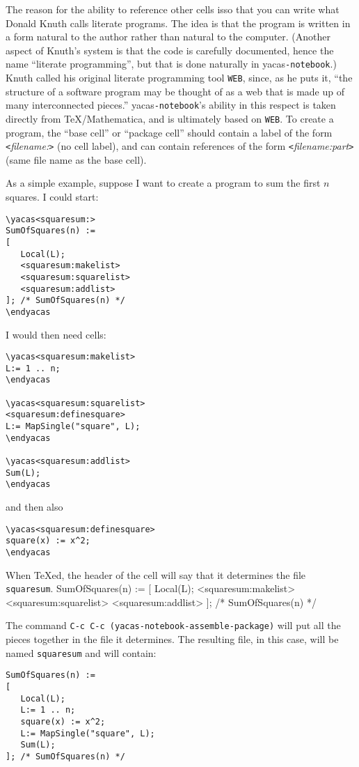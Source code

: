 \documentclass[12pt]{article}
\def\yn{\textsf{yacas}\texttt{-notebook}}
\begin{document}
The reason for the ability to reference other cells isso that you can
write what Donald Knuth calls literate programs.  The idea is that the
program is written in a form natural to the author rather than natural
to the computer.  (Another aspect of Knuth's system is that the code
is carefully documented, hence the name ``literate programming'', but
that is done naturally in \yn.) Knuth called his original literate
programming tool \texttt{WEB}, since, as he puts it, ``the structure
of a software program may be thought of as a web that is made up of
many interconnected pieces.''  \yn's ability in this respect is
taken directly from \TeX/Mathematica, and is ultimately based on
\texttt{WEB}.  To create a program, the ``base cell'' or ``package
cell'' should contain a label of the form
\texttt{<}\textit{filename:}\texttt{>} (no cell label), and can
contain references of the form
\texttt{<}\textit{filename:part}\texttt{>} (same file name as the base
cell).  

As a simple example, suppose I want to create a program to sum the
first $n$ squares.  I could start:
\newpage
\begin{verbatim}
\yacas<squaresum:>
SumOfSquares(n) :=
[
   Local(L);
   <squaresum:makelist>
   <squaresum:squarelist>
   <squaresum:addlist>
]; /* SumOfSquares(n) */
\endyacas
\end{verbatim}
I would then need cells:
\begin{verbatim}
\yacas<squaresum:makelist>
L:= 1 .. n;
\endyacas

\yacas<squaresum:squarelist>
<squaresum:definesquare>
L:= MapSingle("square", L);
\endyacas

\yacas<squaresum:addlist>
Sum(L);
\endyacas
\end{verbatim}
and then also
\begin{verbatim}
\yacas<squaresum:definesquare>
square(x) := x^2;
\endyacas
\end{verbatim}

\newpage

When \TeX{}ed, the header of the cell will say that it determines the
file \texttt{squaresum}.
SumOfSquares(n) :=
[
   Local(L);
   <squaresum:makelist>
   <squaresum:squarelist>
   <squaresum:addlist>
]; /* SumOfSquares(n) */
\endyacas

The command \texttt{C-c C-c (yacas-notebook-assemble-package)} will put all
the pieces together in the file it determines.  The resulting file, in
this case, will be named \texttt{squaresum} and will contain:
\begin{verbatim}
SumOfSquares(n) :=
[
   Local(L);
   L:= 1 .. n;
   square(x) := x^2;
   L:= MapSingle("square", L);
   Sum(L);
]; /* SumOfSquares(n) */
\end{verbatim}
\end{document}
